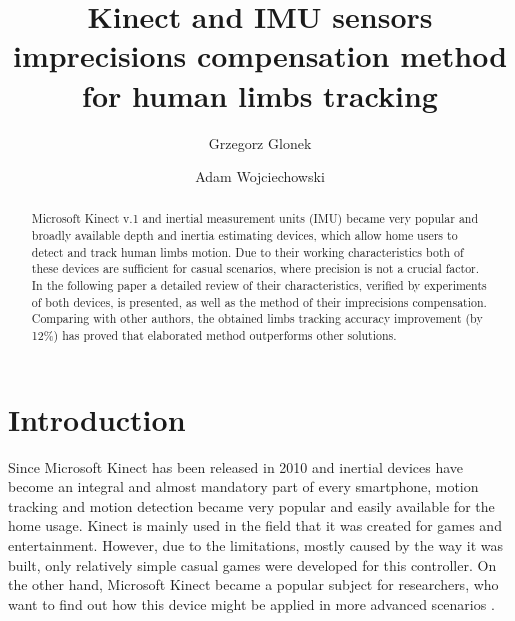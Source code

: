 \documentclass{llncs}
\begin{document}
\title{Kinect and IMU sensors imprecisions compensation method for human limbs tracking}
	
	
\author{Grzegorz Glonek \and Adam Wojciechowski}
	
	

	
\maketitle            
\begin{abstract}
	Microsoft Kinect v.1 and inertial measurement units (IMU) became very popular and broadly available depth and inertia estimating devices, which allow home users to detect and track human limbs motion. Due to their working characteristics both of these devices are sufficient for casual scenarios, where precision is not a crucial factor. In the following paper a detailed review of their characteristics, verified by experiments of both devices, is presented, as well as the method of their imprecisions compensation. Comparing with other authors, the obtained limbs tracking accuracy improvement (by 12\%) has proved that elaborated method outperforms other solutions. 
\end{abstract}
	
\section{Introduction}
Since Microsoft Kinect has been released in 2010 and inertial devices have become an integral and almost mandatory part of every smartphone, motion tracking and motion detection became very popular and easily available for the home usage. Kinect is mainly used in the field that it was created for games and entertainment. However, due to the limitations, mostly caused by the way it was built, only relatively simple casual games were developed for this controller. On the other hand, Microsoft Kinect became a popular subject for researchers, who want to find out how this device might be applied in more advanced scenarios \cite{Lange2012,Chang2011}. 
\end{document}
